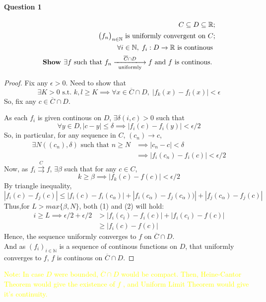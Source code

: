 \documentclass[20pt,a4paper]{extarticle} %
\begin{document}
\paragraph{Question 1}
\begin{eqnarray*}
	C \subseteq D \subseteq \mathbb{R};\\
	\big(f _n\big)_{n \in \mathbb{N}} \text{ is uniformly convergent on } C ;\\
	\forall i \in \mathbb{N} , \; f_i : D \xrightarrow{} \mathbb{R} \text{ is continous }\\
	\textbf{Show } \exists f \text{ such that } f_n \xlongrightarrow [ \text{ uniformly }]{ \overline{C} \cap D } f
	\text{ and } f \text{ is continous. }
\end{eqnarray*}
\begin{proof}

	Fix any $\epsilon > 0$. Need to show that
	\[ \exists K >0 \text{ s.t. } k,l\geq K \implies \forall x \in \overline{C} \cap D, \;
	|f_k(x) - f_l(x) |< \epsilon\]
	So, fix any $c \in \overline{C} \cap D$.

	As each $f_i$ is given continous on $D$, $\exists \delta(i,c) >0 $ such that
	\[ \forall y \in D, |c-y| \leq \delta \implies |f_i(c) - f_i(y)| < \epsilon/2 \]
	So, in particular, for any sequence in $C$, $(c_n) \rightarrow c$,
	\begin{align*}
		\exists N((c_n),\delta) \text{ such that }
		n\geq N & \implies |c_n - c| < \delta \\
		& \implies |f_i(c_n) - f_i(c)| < \epsilon/2
	\end{align*}
	Now, as $f_i \overset{C}{\rightrightarrows} f$, $\exists \beta$ such that
	for any $c \in C$,
	\begin{equation*}
		k \geq \beta \implies |f_k(c) - f(c)| < \epsilon/2
	\end{equation*}
	By triangle inequality,
	\[ |f_i(c) - f_j(c)| \leq |f_i(c) - f_i(c_\alpha)| + |f_i(c_\alpha) - f_j(c_\alpha))|+|f_j(c_\alpha) - f_j(c)|\]
	Thus,for $L > max\{ \beta , N \}$, both (1) and (2) will hold:
	\begin{align*}
		i \geq L \implies \epsilon/2 +\epsilon/2 &> |f_i(c_i) - f_i(c)|+ |f_i(c_i) - f(c)| \\
							 &\geq |f_i(c) - f(c) |
	\end{align*}
	Hence, the sequence uniformly converges to $f$ on $\overline{C}\cap D$.\\
	And as $(f_i)_{i \in \mathbb{N}}$ is a sequence of continous functions on $D$, that uniformly converges to $f$,
	$f$ is continous on $\overline{C}\cap D$.
\end{proof}
\textcolor{yellow}{Note: In case $D$ were bounded, $\overline{C} \cap D $ would be compact. Then, Heine-Cantor Theorem would give the existence of $f$ , and Uniform Limit Theorem would give it's continuity.   }
\end{document}
